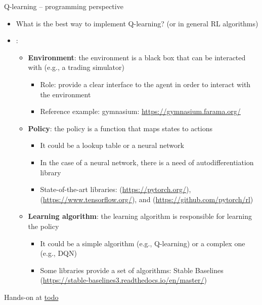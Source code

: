\documentclass[presentation, 9pt]{beamer}\mode<presentation>{\usetheme{AMSBolognaFC}}
\begin{document}
\begin{frame}{Q-learning -- programming perspective}
	\begin{itemize}
		\item What is the best way to implement Q-learning? (or in general RL algorithms)
		\item {}:
		\begin{itemize}
			\item \textbf{Environment}: the environment is a black box that can be interacted with (e.g., a trading simulator)
			\begin{itemize}
				\item Role: provide a clear interface to the agent in order to interact with the environment
				\item Reference example: gymnasium: \url{https://gymnasium.farama.org/}
			\end{itemize}
			\item \textbf{Policy}: the policy is a function that maps states to actions
			\begin{itemize}
				\item It could be a lookup table or a neural network
				\item In the case of a neural network, there is a need of autodifferentiation library
				\item State-of-the-art libraries:  (\url{https://pytorch.org/}),  (\url{https://www.tensorflow.org/}), and  (\url{https://github.com/pytorch/rl})
			\end{itemize}
			\item \textbf{Learning algorithm}: the learning algorithm is responsible for learning the policy
			\begin{itemize}
				\item It could be a simple algorithm (e.g., Q-learning) or a complex one (e.g., DQN)
				\item Some libraries provide a set of algorithms: Stable Baselines (\url{https://stable-baselines3.readthedocs.io/en/master/})
			\end{itemize}
		\end{itemize}
	\end{itemize}
	\centering 
	\Large Hands-on at \url{todo}
\end{frame}
\end{document}
